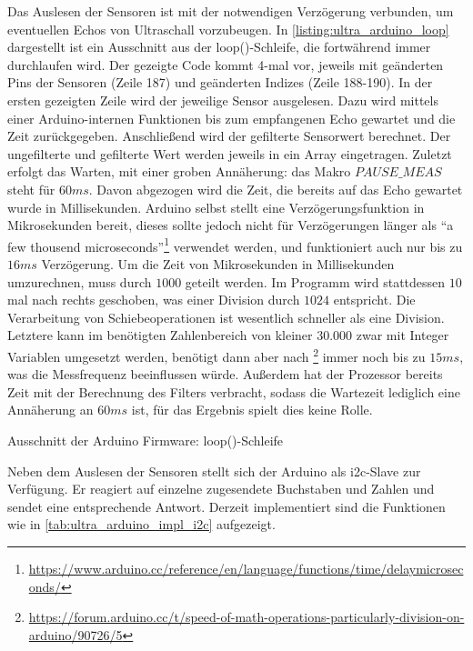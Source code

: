 Das Auslesen der Sensoren ist mit der notwendigen Verzögerung verbunden, um eventuellen Echos von Ultraschall vorzubeugen. In \ref{listing:ultra_arduino_loop} dargestellt ist ein Ausschnitt aus der loop()-Schleife, die fortwährend immer durchlaufen wird. Der gezeigte Code kommt 4-mal vor, jeweils mit geänderten Pins der Sensoren (Zeile 187) und geänderten Indizes (Zeile 188-190). In der ersten gezeigten Zeile wird der jeweilige Sensor ausgelesen. Dazu wird mittels einer Arduino-internen Funktionen bis zum empfangenen Echo gewartet und die Zeit zurückgegeben. Anschließend wird der gefilterte Sensorwert berechnet. Der ungefilterte und gefilterte Wert werden jeweils in ein Array eingetragen. Zuletzt erfolgt das Warten, mit einer groben Annäherung: das Makro $PAUSE\_MEAS$ steht für $60ms$. Davon abgezogen wird die Zeit, die bereits auf das Echo gewartet wurde in Millisekunden. Arduino selbst stellt eine Verzögerungsfunktion in Mikrosekunden bereit, dieses sollte jedoch nicht für Verzögerungen länger als \enquote{a few thousend microseconds}\footnote{\url{https://www.arduino.cc/reference/en/language/functions/time/delaymicroseconds/}} verwendet werden, und funktioniert auch nur bis zu $16ms$ Verzögerung. Um die Zeit von Mikrosekunden in Millisekunden umzurechnen, muss durch $1000$ geteilt werden. Im Programm wird stattdessen $10$ mal nach rechts geschoben, was einer Division durch $1024$ entspricht. Die Verarbeitung von Schiebeoperationen ist wesentlich schneller als eine Division. Letztere kann im benötigten Zahlenbereich von kleiner $30.000$ zwar mit Integer Variablen umgesetzt werden, benötigt dann aber nach \footnote{\url{https://forum.arduino.cc/t/speed-of-math-operations-particularly-division-on-arduino/90726/5}} immer noch bis zu $15ms$, was die Messfrequenz beeinflussen würde. Außerdem hat der Prozessor bereits Zeit mit der Berechnung des Filters verbracht, sodass die Wartezeit lediglich eine Annäherung an $60ms$ ist, für das Ergebnis spielt dies keine Rolle.  

\begin{listing}[!ht]
    \caption{Ausschnitt der Arduino Firmware: loop()-Schleife}
    \label{listing:ultra_arduino_loop}
\end{listing}

Neben dem Auslesen der Sensoren stellt sich der Arduino als \gls{i2c}-Slave zur Verfügung. Er reagiert auf einzelne zugesendete Buchstaben und Zahlen und sendet eine entsprechende Antwort. Derzeit implementiert sind die Funktionen wie in \ref{tab:ultra_arduino_impl_i2c} aufgezeigt.

